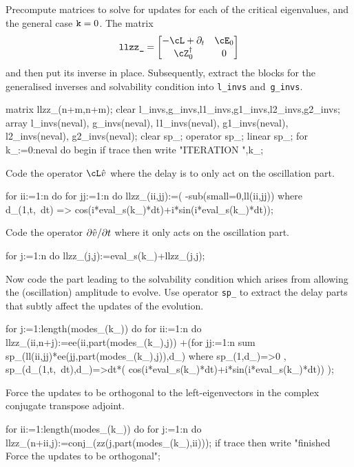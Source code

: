 \documentclass[11pt,a5paper]{article}
\newcommand{\adj}[1]{#1^\dagger} %
\begin{document}
Precompute matrices to solve for updates for each of the
critical eigenvalues, and the general case $\verb|k|=0$. The
matrix 
\begin{equation*}
\verb|llzz_| = \begin{bmatrix} -\cL+\partial_t & \cE_0 
\\ \adj\cZ_0 & 0 \end{bmatrix}
\end{equation*}
and then put its inverse in place. Subsequently, extract the
blocks for the generalised inverses and solvability
condition into \verb|l_invs| and~\verb|g_invs|.
\begin{reduce}
matrix llzz_(n+m,n+m);
clear l_invs,g_invs,l1_invs,g1_invs,l2_invs,g2_invs;
array l_invs(neval), g_invs(neval), l1_invs(neval), 
     g1_invs(neval), l2_invs(neval), g2_invs(neval);
clear sp_; operator sp_; linear sp_;
for k_:=0:neval do begin
  if trace then write "ITERATION ",k_; 
\end{reduce}

Code the operator \(\cL\hat v\) where the delay is to only
act on the oscillation part.
\begin{reduce}
  for ii:=1:n do for jj:=1:n do llzz_(ii,jj):=(
      -sub(small=0,ll(ii,jj)) where d_(1,t,~dt)
      => cos(i*eval_s(k_)*dt)+i*sin(i*eval_s(k_)*dt));
\end{reduce}

Code the operator \(\D t{\hat v}\) where it only acts on the
oscillation part.
\begin{reduce}
  for j:=1:n do llzz_(j,j):=eval_s(k_)+llzz_(j,j);
\end{reduce}

Now code the part leading to the solvability condition which
arises from allowing the (oscillation) amplitude to evolve.
Use operator \verb|sp_| to extract the delay parts that
subtly affect the updates of the evolution.
\begin{reduce}
  for j:=1:length(modes_(k_)) do 
    for ii:=1:n do llzz_(ii,n+j):=ee(ii,part(modes_(k_),j))
     +(for jj:=1:n sum 
       sp_(ll(ii,jj)*ee(jj,part(modes_(k_),j)),d_)
       where { sp_(1,d_)=>0
             , sp_(d_(1,t,~dt),d_)=>dt*(
               cos(i*eval_s(k_)*dt)+i*sin(i*eval_s(k_)*dt))
             });
\end{reduce}

Force the updates to be orthogonal to the left-eigenvectors
in the complex conjugate transpose adjoint.
\begin{reduce}
  for ii:=1:length(modes_(k_)) do for j:=1:n do 
      llzz_(n+ii,j):=conj_(zz(j,part(modes_(k_),ii)));
  if trace then write 
  "finished Force the updates to be orthogonal";
\end{reduce}
\end{document}

